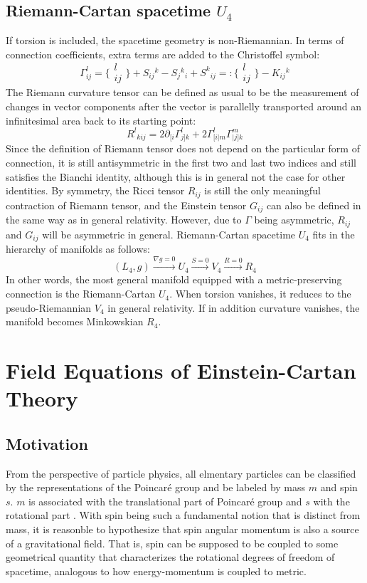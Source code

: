 \documentclass[12pt]{article}
\begin{document}
\subsection{Riemann-Cartan spacetime $U_4$}
If torsion is included, the spacetime geometry is non-Riemannian. In terms of connection coefficients, extra terms are added to the Christoffel symbol:
\[ \Gamma^l_{ij} = \{\substack{l\\ij}\} + S_{ij}{}^k - S_j{}^k{}_i + S^k{}_{ij} =: \{\substack{l\\ij}\} - K_{ij}{}^k \]
The Riemann curvature tensor can be defined as usual to be the measurement of changes in vector components after the vector is parallelly transported around an infinitesimal area back to its starting point:
\[ R^l{}_{kij} = 2\partial_{[i}\Gamma^l_{j]k} + 2\Gamma^l_{[i|m}\Gamma^m_{|j]k} \] 
Since the definition of Riemann tensor does not depend on the particular form of connection, it is still antisymmetric in the first two and last two indices and still satisfies the Bianchi identity, although this is in general not the case for other identities. By symmetry, the Ricci tensor $R_{ij}$ is still the only meaningful contraction of Riemann tensor, and the Einstein tensor $G_{ij}$ can also be defined in the same way as in general relativity. However, due to $\Gamma$ being asymmetric, $R_{ij}$ and $G_{ij}$ will be asymmetric in general. Riemann-Cartan spacetime $U_4$ fits in the hierarchy of manifolds as follows:
\[ (L_4, g) \xrightarrow{\nabla g = 0} U_4 \xrightarrow{S=0} V_4 \xrightarrow{R = 0} R_4\]
In other words, the most general manifold equipped with a metric-preserving connection is the Riemann-Cartan $U_4$. When torsion vanishes, it reduces to the pseudo-Riemannian $V_4$ in general relativity. If in addition curvature vanishes, the manifold becomes Minkowskian $R_4$.

\section{Field Equations of Einstein-Cartan Theory}
\subsection{Motivation}
From the perspective of particle physics, all elmentary particles can be classified by the representations of the Poincar\'e group and be labeled by mass $m$ and spin $s$. $m$ is associated with the translational part of Poincar\'e group and $s$ with the rotational part \cite{hehl1976general}. With spin being such a fundamental notion that is distinct from mass, it is reasonble to hypothesize that spin angular momentum is also a source of a gravitational field. That is, spin can be supposed to be coupled to some geometrical quantity that characterizes the rotational degrees of freedom of spacetime, analogous to how energy-momentum is coupled to metric.
\end{document}
